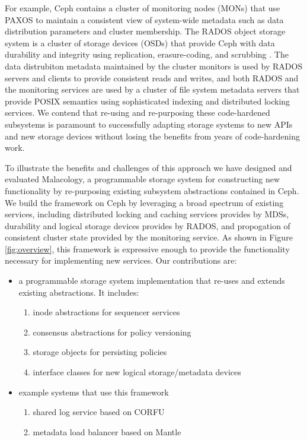\documentclass[10pt,twocolumn]{article}
\begin{document}
For example, Ceph \autocite{weil_ceph_2006} contains a cluster of
monitoring nodes (MONs) that use PAXOS to maintain a consistent view of
system-wide metadata such as data distribution parameters and cluster
membership. The RADOS object storage system is a cluster of storage
devices (OSDs) that provide Ceph with data durability and integrity
using replication, erasure-coding, and scrubbing
\autocite{weil_rados_2007}. The data distrubiton metadata maintained by
the cluster monitors is used by RADOS servers and clients to provide
consistent reads and writes, and both RADOS and the monitoring services
are used by a cluster of file system metadata servers that provide POSIX
semantics using sophisticated indexing and distributed locking services.
We contend that re-using and re-purposing these code-hardened subsystems
is paramount to successfully adapting storage systems to new APIs and
new storage devices without losing the benefits from years of
code-hardening work.

To illustrate the benefits and challenges of this approach we have
designed and evaluated Malacology, a programmable storage system for
constructing new functionality by re-purposing existing subsystem
abstractions contained in Ceph. We build the framework on Ceph by
leveraging a broad spectrum of existing services, including distributed
locking and caching services provides by MDSs, durability and logical
storage devices provides by RADOS, and propogation of consistent cluster
state provided by the monitoring service. As shown in Figure
\ref{fig:overview}, this framework is expressive enough to provide the
functionality necessary for implementing new services. Our contributions
are:

\begin{itemize}
\itemsep1pt\parskip0pt
\item
  a programmable storage system implementation that re-uses and extends
  existing abstractions. It includes:

  \begin{enumerate}
  \def\labelenumi{\arabic{enumi}.}
  \itemsep1pt\parskip0pt
  \item
    inode abstractions for sequencer services
  \item
    consensus abstractions for policy versioning
  \item
    storage objects for persisting policies
  \item
    interface classes for new logical storage/metadata devices
  \end{enumerate}
\item
  example systems that use this framework

  \begin{enumerate}
  \def\labelenumi{\arabic{enumi}.}
  \itemsep1pt\parskip0pt
  \item
    shared log service based on CORFU \autocite{balakrishnan_corfu_2012}
  \item
    metadata load balancer based on Mantle
    \autocite{sevilla:sc15-mantle}
  \end{enumerate}
\end{itemize}
\end{document}
